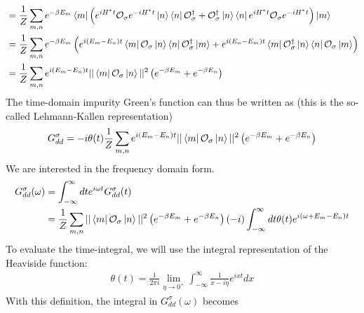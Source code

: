 \documentclass{report}
\numberwithin{equation}{section}
\begin{document}
\begin{appendices}
\begin{equation}
\begin{aligned}
	&= \frac{1}{Z}\sum_{m,n}e^{-\beta E_m}\bra{m}\left( e^{iH^* t}\mathcal{O}_{\sigma}e^{-iH^* t}\ket{n}\bra{n}\mathcal{O}^\dagger_{\sigma} + \mathcal{O}^\dagger_{\sigma}\ket{n}\bra{n}e^{iH^* t}\mathcal{O}_{\sigma}e^{-iH^* t}\right) \ket{m}\\
	&= \frac{1}{Z}\sum_{m,n}e^{-\beta E_m}\left( e^{i\left( E_m - E_n \right)  t}\bra{m}\mathcal{O}_{\sigma}\ket{n}\bra{n}\mathcal{O}^\dagger_{\sigma} \ket{m} + e^{i\left( E_n - E_m \right)  t}\bra{m}\mathcal{O}^\dagger_{\sigma}\ket{n}\bra{n}\mathcal{O}_{\sigma} \ket{m}\right)\\
	&= \frac{1}{Z}\sum_{m,n}e^{i\left( E_m - E_n \right)  t}||\bra{m}\mathcal{O}_{\sigma}\ket{n}||^2\left( e^{-\beta E_m} + e^{-\beta E_n}\right)\\
\end{aligned}\end{equation}
The time-domain impurity Green's function can thus be written as (this is the so-called Lehmann-Kallen representation)
\begin{equation}\begin{aligned}
	G_{dd}^\sigma = -i\theta(t)\frac{1}{Z}\sum_{m,n}e^{i\left( E_m - E_n \right)  t}||\bra{m}\mathcal{O}_{\sigma}\ket{n}||^2\left( e^{-\beta E_m} + e^{-\beta E_n}\right)\\
\end{aligned}\end{equation}
We are interested in the frequency domain form.
\begin{equation}\begin{aligned}
	G_{d d}^\sigma(\omega) &= \int_{-\infty}^\infty dt e^{i \omega t}G_{d d}^\sigma(t) \\
			       &= \frac{1}{Z}\sum_{m,n}||\bra{m}\mathcal{O}_{\sigma}\ket{n}||^2\left( e^{-\beta E_m} + e^{-\beta E_n}\right)\left(-i\right)\int_{-\infty}^\infty dt \theta(t)e^{i\left( \omega + E_m - E_n \right)t}
\end{aligned}\end{equation}
To evaluate the time-integral, we will use the integral representation of the Heaviside function:
\begin{equation}\begin{aligned}
	\theta(t) = \frac{1}{2\pi i}\lim_{\eta \to 0^+} \int_{-\infty}^\infty \frac{1}{x- i\eta}e^{ixt}dx
\end{aligned}\end{equation}
With this definition, the integral in \(G_{dd}^\sigma(\omega)\) becomes
\begin{equation}\begin{aligned}

\end{aligned}
\end{equation}
\end{appendices}
\end{document}

